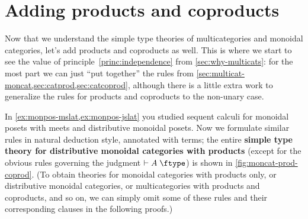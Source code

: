 \section{Adding products and coproducts}
\label{sec:multicat-prod-coprod}

Now that we understand the simple type theories of multicategories and monoidal categories, let's add products and coproducts as well.
This is where we start to see the value of principle~\eqref{princ:independence} from \cref{sec:why-multicats}: for the most part we can just ``put together'' the rules from \cref{sec:multicat-moncat,sec:catprod,sec:catcoprod}, although there is a little extra work to generalize the rules for products and coproducts to the non-unary case.

In \cref{ex:monpos-mslat,ex:monpos-jslat} you studied sequent calculi for monoidal posets with meets and distributive monoidal posets.
Now we formulate similar rules in natural deduction style, annotated with terms; the entire \textbf{simple type theory for distributive monoidal categories with products} (except for the obvious rules governing the judgment $\types A\type$) is shown in \cref{fig:moncat-prod-coprod}.
(To obtain theories for monoidal categories with products only, or distributive monoidal categories, or multicategories with products and coproducts, and so on, we can simply omit some of these rules and their corresponding clauses in the following proofs.)


